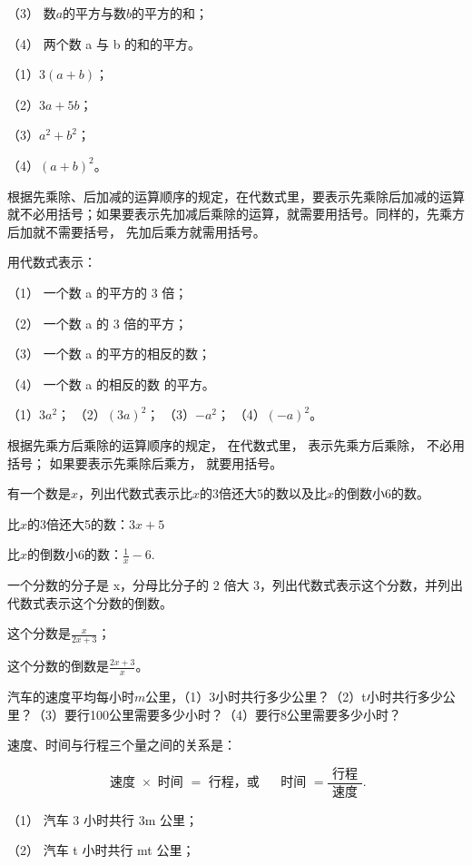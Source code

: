 （3） 数\(a\)的平方与数\(b\)的平方的和；

（4） 两个数 a 与 b 的和的平方。

 （1）\(3(a + b)\)；

（2）\(3a + 5b\)；

（3）\(a^2 + b^2\)；

（4）\((a + b)^2\)。

根据先乘除、后加减的运算顺序的规定，在代数式里，要表示先乘除后加减的运算就不必用括号；如果要表示先加减后乘除的运算，就需要用括号。同样的，先乘方后加就不需要括号，
先加后乘方就需用括号。

 用代数式表示：

（1） 一个数 a 的平方的 3 倍；

（2） 一个数 a 的 3 倍的平方；

（3） 一个数 a 的平方的相反的数；

（4） 一个数 a 的相反的数 的平方。

 （1）\(3a^{2}\)； （2）\((3a)^{2}\)； （3）\(-a^{2}\)；
（4）\((-a)^{2}\)。

 根据先乘方后乘除的运算顺序的规定， 在代数式里，
表示先乘方后乘除， 不必用括号； 如果要表示先乘除后乘方， 就要用括号。

有一个数是\(x\)，列出代数式表示比\(x\)的3倍还大5的数以及比\(x\)的倒数小6的数。

 比\(x\)的3倍还大5的数：\(3x + 5\)

比\(x\)的倒数小6的数：\(\frac{1}{x} -6.\)

 一个分数的分子是 x，分母比分子的 2 倍大
3，列出代数式表示这个分数，并列出代数式表示这个分数的倒数。

 这个分数是\(\frac{x}{2x + 3}\)；

这个分数的倒数是\(\frac{2x + 3}{x}\)。

汽车的速度平均每小时\(m\)公里，（1）3小时共行多少公里？（2）t小时共行多少公里？（3）要行100公里需要多少小时？（4）要行8公里需要多少小时？

 速度、时间与行程三个量之间的关系是：

\[
\text{ 速度 } \times \text{ 时间 } = \text{ 行程，或 } \quad \text{ 时间 } = \frac{\text{ 行程 }}{\text{ 速度 }}.
\]

 （1） 汽车 3 小时共行 3m 公里；

（2） 汽车 t 小时共行 mt 公里；

